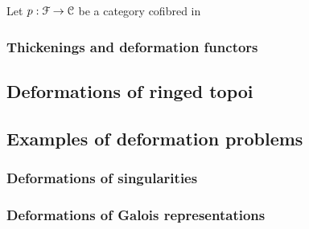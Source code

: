                 \begin{definition} \label{def: predeformation_fibrations}
                    Let $p: \mathcal{F} \to \mathcal{C}$ be a category cofibred in 
                \end{definition}
    
        \subsubsection{Thickenings and deformation functors}
        
    \subsection{Deformations of ringed topoi}
    
    \subsection{Examples of deformation problems}
        \subsubsection{Deformations of singularities}
        
        \subsubsection{Deformations of Galois representations}